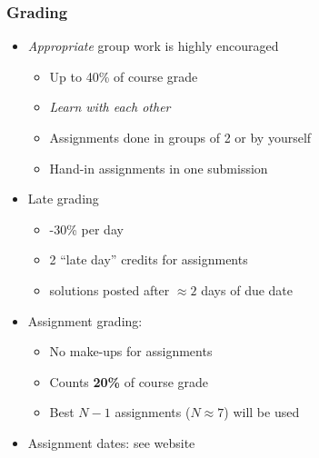 \begin{frame}\frametitle{Grading}
	
	\begin{itemize}
		\item	\emph{Appropriate} group work is highly encouraged 
		\begin{itemize}
			\item	Up to 40\% of course grade 
			\item	\emph{Learn with each other} 
			\item	Assignments done in groups of 2 or by yourself 
			\item	Hand-in assignments in one submission 
		\end{itemize}
		\item	Late grading 
		\begin{itemize}
			\item	-30\% per day 
			\item	2 ``late day'' credits for assignments 
			\item	solutions posted after $\approx 2$ days of due date 
		\end{itemize}
		\item	Assignment grading: 
		\begin{itemize}
			\item	No make-ups for assignments 
			\item	Counts \textbf{20\%} of course grade 
			\item	Best $N-1$ assignments ($N \approx 7$) will be used 
		\end{itemize}
		\item	Assignment dates: see website 
	\end{itemize}
\end{frame}


